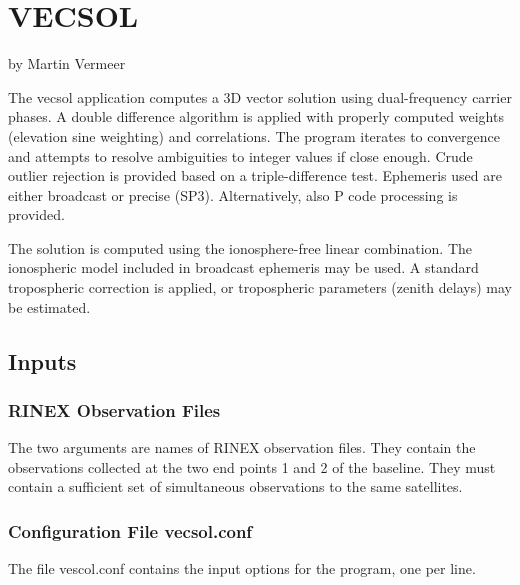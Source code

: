 \chapter{VECSOL}
by Martin Vermeer
       
The vecsol application computes a  3D vector solution using dual-frequency carrier phases. A double difference algorithm is applied with properly computed weights (elevation sine weighting)  and  correlations. The  program  iterates to convergence and attempts to resolve ambiguities to integer values if close enough.  Crude  outlier  rejection  is  provided  based  on  a  triple-difference  test. Ephemeris used are either broadcast or precise (SP3). Alternatively, also P code processing is provided.

       The solution is computed using the ionosphere-free linear combination.  The ionospheric  model included in broadcast ephemeris may be used. A standard tropospheric correction is applied, or tropospheric parameters (zenith delays) may be estimated.

\section{Inputs}

\subsection{RINEX Observation Files}
The two arguments are names of RINEX observation files. They contain the observations 
collected at the two end points 1 and 2 of the baseline.  They
must contain a sufficient set of simultaneous observations to the same satellites.

\subsection{Configuration File vecsol.conf}
The file vescol.conf contains the input options for the program, one per line.

